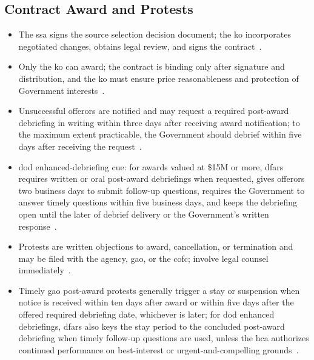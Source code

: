 \documentclass[../main.tex]{subfiles}
\begin{document}
\subsection{Contract Award and Protests}
\begin{itemize}
  \item The \ac{ssa} signs the source selection decision document; the \ac{ko} incorporates negotiated changes, obtains legal review, and signs the contract~\autocite{edo-3-2-3-source-selection-2025,FAR-15-303-Responsibilities,FAR-15-308-Source-Selection-Decision}.
  \item Only the \ac{ko} can award; the contract is binding only after signature and distribution, and the \ac{ko} must ensure price reasonableness and protection of Government interests~\autocite{edo-3-2-3-source-selection-2025,FAR-15-303-Responsibilities,FAR-1-602-Contracting-Officer-Authority}.
  \item Unsuccessful offerors are notified and may request a required post-award debriefing in writing within three days after receiving award notification; to the maximum extent practicable, the Government should debrief within five days after receiving the request~\autocite{edo-3-2-3-source-selection-2025,FAR-15-506-Postaward-Debriefing}.
  \item \ac{dod} enhanced-debriefing cue: for awards valued at \$15M or more, \ac{dfars} requires written or oral post-award debriefings when requested, gives offerors two business days to submit follow-up questions, requires the Government to answer timely questions within five business days, and keeps the debriefing open until the later of debrief delivery or the Government's written response~\autocite{DFARS-215-506-Postaward-Debriefing,DFARS-215-506-70-Followup-Questions}.
  \item Protests are written objections to award, cancellation, or termination and may be filed with the agency, \ac{gao}, or the \ac{cofc}; involve legal counsel immediately~\autocite{edo-3-2-3-source-selection-2025,FAR-33-101-Protest-Definitions,FAR-33-102-Protest-General}.
  \item Timely \ac{gao} post-award protests generally trigger a stay or suspension when notice is received within ten days after award or within five days after the offered required debriefing date, whichever is later; for \ac{dod} enhanced debriefings, \ac{dfars} also keys the stay period to the concluded post-award debriefing when timely follow-up questions are used, unless the \ac{hca} authorizes continued performance on best-interest or urgent-and-compelling grounds~\autocite{edo-3-2-3-source-selection-2025,FAR-33-104-GAO-Protests,DFARS-233-104-GAO-Protests}.
\end{itemize}
\end{document}
